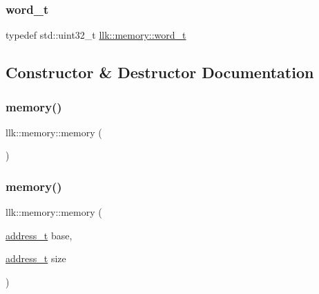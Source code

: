 \mbox{\label{classllk_1_1memory_a432a6c0ae1bcb9c44d79cfa1a239419c}} 
\subsubsection{\texorpdfstring{word\+\_\+t}{word\_t}}
{\footnotesize\ttfamily typedef std\+::uint32\+\_\+t \hyperlink{classllk_1_1memory_a432a6c0ae1bcb9c44d79cfa1a239419c}{llk\+::memory\+::word\+\_\+t}}



\subsection{Constructor \& Destructor Documentation}
\mbox{\label{classllk_1_1memory_a7069a8b6f6ef11b17f2346db9d943204}} 
\subsubsection{\texorpdfstring{memory()}{memory()}\hspace{0.1cm}{\footnotesize\ttfamily [1/4]}}
{\footnotesize\ttfamily llk\+::memory\+::memory (\begin{DoxyParamCaption}{ }\end{DoxyParamCaption})\hspace{0.3cm}{\ttfamily [inline]}}

\mbox{\label{classllk_1_1memory_a3b2eedc557f34c00cb0a7bc677e1cb5a}} 
\subsubsection{\texorpdfstring{memory()}{memory()}\hspace{0.1cm}{\footnotesize\ttfamily [2/4]}}
{\footnotesize\ttfamily llk\+::memory\+::memory (\begin{DoxyParamCaption}\item[{\hyperlink{classllk_1_1memory_ae7a4b897aa999f22e250dc8e4d773dec}{address\+\_\+t}}]{base,  }\item[{\hyperlink{classllk_1_1memory_ae7a4b897aa999f22e250dc8e4d773dec}{address\+\_\+t}}]{size }\end{DoxyParamCaption})}

